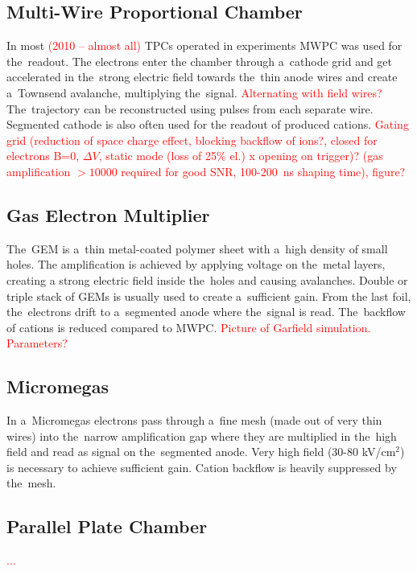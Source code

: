 		\subsection{Multi-Wire Proportional Chamber}
			In most \textcolor{red}{(2010 -- almost all)} \ac{TPC}s operated in experiments \acf{MWPC} was used for the~readout. The electrons enter the chamber through a~cathode grid and get accelerated in the~strong electric field towards the~thin anode wires and create a~Townsend avalanche, multiplying the~signal. \textcolor{red}{Alternating with field wires?} The~trajectory can be reconstructed using pulses from each separate wire. Segmented cathode is also often used for the readout of produced cations. \textcolor{red}{Gating grid (reduction of space charge effect, blocking backflow of ions?, closed for electrons B=0, $\Delta V$, static mode (loss of 25\% el.) x opening on trigger)? (gas amplification $>10000$ required for good SNR, 100-200~ns shaping time), figure?}
			
		\subsection{Gas Electron Multiplier}
			The~\acf{GEM} is a~thin metal\nobreakdash-coated polymer sheet with a~high density of small holes. The amplification is achieved by applying voltage on the~metal layers, creating a strong electric field inside the~holes and causing avalanches. Double or triple stack of \ac{GEM}s is usually used to create a~sufficient gain. From the last foil, the~electrons drift to a~segmented anode where the~signal is read. The~backflow of cations is reduced compared to \ac{MWPC}. \textcolor{red}{Picture of Garfield simulation. Parameters?}
		
		\subsection{Micromegas}
			In a~\ac{Micromegas} electrons pass through a~fine mesh (made out of very thin wires) into the~narrow amplification gap where they are multiplied in the~high field and read as signal on the~segmented anode. Very high field (30-80 kV/cm$^2$) is necessary to achieve sufficient gain. Cation backflow is heavily suppressed by the~mesh.
			
		\subsection{Parallel Plate Chamber}
			\textcolor{red}{...}
			

